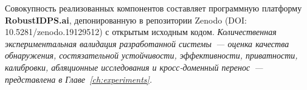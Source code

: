 Совокупность реализованных компонентов составляет программную
платформу \textbf{RobustIDPS.ai}, депонированную в репозитории Zenodo
(DOI: 10.5281/zenodo.19129512) с открытым исходным кодом.
\emph{Количественная экспериментальная валидация разработанной
системы~--- оценка качества обнаружения, состязательной
устойчивости, эффективности, приватности, калибровки,
абляционные исследования и кросс-доменный перенос~--- представлена
в Главе~\ref{ch:experiments}.}
